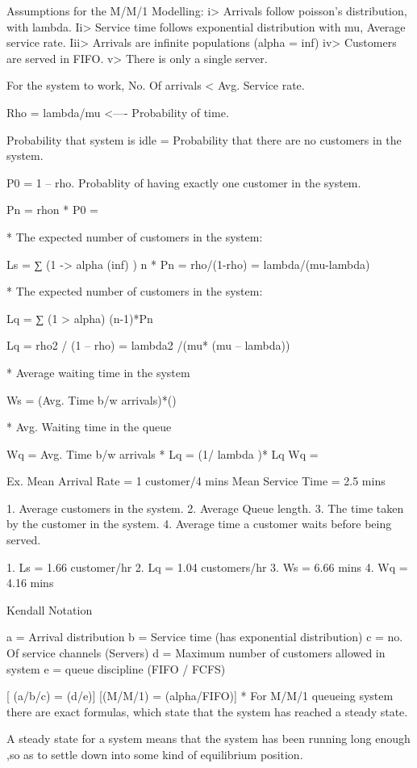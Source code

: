 Assumptions for the M/M/1 Modelling:
i> Arrivals follow poisson’s distribution, with lambda.
Ii> Service time follows exponential distribution with mu, Average service rate.
Iii> Arrivals are infinite populations (alpha = inf)
iv> Customers are served in FIFO.
v> There is only a single server.

For the system to work, No. Of arrivals < Avg. Service rate.

Rho = lambda/mu <---- Probability of time.

Probability that system is idle = Probability that there are no customers in the system.

P0 = 1 – rho.
Probablity of having exactly one customer in the system.

Pn = rhon * P0  = 

* The expected number of customers in the system:

Ls = ∑ (1 -> alpha (inf) ) n * Pn
= rho/(1-rho) = lambda/(mu-lambda)

* The expected number of customers in the system:

Lq = ∑ (1 > alpha) (n-1)*Pn 


Lq = rho2 / (1 – rho) = lambda2 /(mu* (mu – lambda))

* Average waiting time in the system

Ws = (Avg. Time b/w arrivals)*()


* Avg. Waiting time in the queue

Wq = Avg. Time b/w arrivals * Lq  = (1/ lambda )* Lq 
Wq  = 

Ex. Mean Arrival Rate = 1 customer/4 mins
	 Mean Service Time = 2.5 mins

1. Average customers in the system.
2. Average Queue length.
3. The time taken by the customer in the system.
4. Average time a customer waits before being served.

1. Ls = 1.66 customer/hr
2. Lq = 1.04 customers/hr
3. Ws = 6.66 mins
4. Wq = 4.16 mins



						Kendall Notation

a = Arrival distribution
b = Service time (has exponential distribution)
c = no. Of service channels (Servers)
d = Maximum number of customers allowed in system
e = queue discipline (FIFO / FCFS)

[ (a/b/c) = (d/e)]
[(M/M/1) = (alpha/FIFO)]
* For M/M/1 queueing system there are exact formulas, which state that the system has reached a steady state.

A steady state for a system means that the system has been running long enough ,so as to settle down into some kind of equilibrium position.

